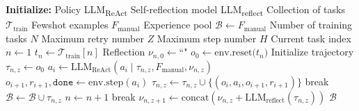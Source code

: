 \documentclass[letterpaper]{article} %
\begin{document}
\begin{algorithm}
    \caption{ExpeL - Experience Gathering}
    \begin{algorithmic}
    \STATE \textbf{Initialize:} 
    \STATE Policy LLM\textsubscript{ReAct}
    \STATE Self-reflection model LLM\textsubscript{reflect}
    \STATE Collection of tasks $\mathcal{T}_\text{train}$
    \STATE Fewshot examples $F_\text{manual}$
    \STATE Experience pool $\mathcal{B} \leftarrow \text{$F_{\text{manual}}$}$
    \STATE Number of training tasks $N$
    \STATE Maximum retry number $Z$
    \STATE Maximum step number $H$
    \STATE Current task index $n\leftarrow 1$
        \STATE \( t_n \leftarrow \mathcal{T}_\text{train}[n] \)
        \STATE Reflection \( \nu_{n,0} \leftarrow \text{``"} \)
            \STATE \( o_0 \leftarrow \text{env.reset($t_n$)} \)
            \STATE Initialize trajectory \( \tau_{n,z} \leftarrow o_0 \)
                \STATE \( a_i \leftarrow \text{LLM}_\text{ReAct}(a_i\mid \tau_{n,z}, F_\text{manual},\nu_{n,z}) \)
                \STATE \( o_{i+1}, r_{i+1}, \texttt{done} \leftarrow \text{env.step}(a_i) \)
                \STATE \( \tau_{n,z} \leftarrow \tau_{n,z} \cup \{(o_i,a_i,o_{i+1},r_{i+1})\} \)
                    \STATE break
                \ENDIF
            \ENDFOR
            \STATE \( \mathcal{B} \leftarrow \mathcal{B} \cup \tau_{n,z} \)
                \STATE \( n \leftarrow n+1 \)
                \STATE break
            \ELSE
                \STATE \( \nu_{n,z+1} \leftarrow \text{concat}(\nu_{n,z} + \text{LLM}_\text{reflect}(\tau_{n,z})) \)
            \ENDIF
        \ENDFOR
    \ENDWHILE
    \RETURN \( \mathcal{B} \)
    \end{algorithmic}
    \label{alg:exp_gather}
    \end{algorithm}
    
\end{document}
